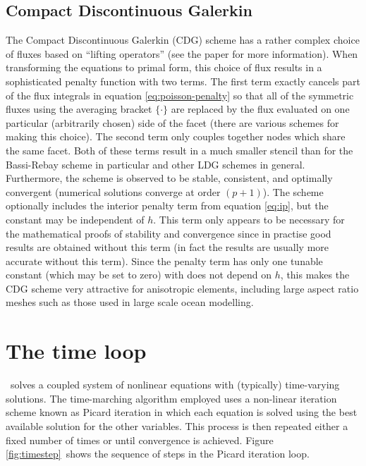 \subsection{Compact Discontinuous Galerkin}
\label{CDG}
  The Compact Discontinuous Galerkin (CDG) scheme
\cite{peraire2008} has a rather complex choice of fluxes based on
``lifting operators'' (see the paper for more information). When
transforming the equations to primal form, this choice of flux results
in a sophisticated penalty function with two terms. The first term
exactly cancels part of the flux integrals in equation
\eqref{eq:poisson-penalty} so that all of the symmetric fluxes using
the averaging bracket $\{\cdot\}$ are replaced by the flux evaluated
on one particular (arbitrarily chosen) side of the facet (there are
various schemes for making this choice). The second term only couples
together nodes which share the same facet. Both of these terms result
in a much smaller stencil than for the Bassi-Rebay scheme in
particular and other LDG schemes in general. Furthermore, the scheme
is observed to be stable, consistent, and optimally convergent
(numerical solutions converge at order $(p+1)$). The scheme optionally
includes the interior penalty term from equation \eqref{eq:ip}, but
the constant may be independent of $h$. This term only appears to be
necessary for the mathematical proofs of stability and convergence
since in practise good results are obtained without this term (in fact
the results are usually more accurate without this term). Since the
penalty term has only one tunable constant (which may be set to zero)
with does not depend on $h$, this makes the CDG scheme very attractive
for anisotropic elements, including large aspect ratio meshes such as
those used in large scale ocean modelling.

\section{The time loop}
\label{sect:ND_time_loop}

\fluidity\ solves a coupled system of nonlinear equations with (typically)
time-varying solutions. The time-marching algorithm employed uses a
non-linear iteration scheme known as Picard iteration in which each equation
is solved using the best available solution for the other variables. This
process is then repeated either a fixed number of times or until convergence
is achieved. Figure \ref{fig:timestep}\ shows the sequence of steps in the
Picard iteration loop. 

